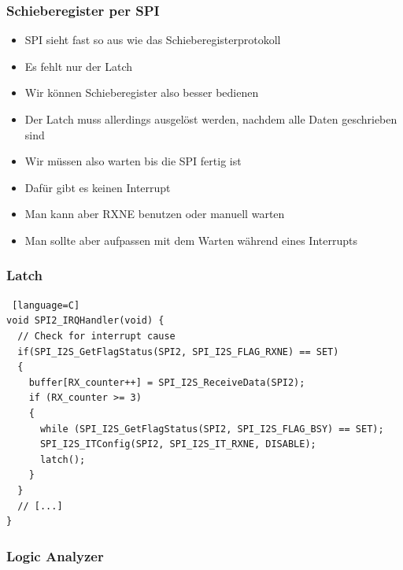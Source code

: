 \documentclass[ngerman,compress]{beamer}
\begin{document}
\begin{frame} [fragile]
	\frametitle{Schieberegister per SPI}
	\begin{itemize}
		\item SPI sieht fast so aus wie das Schieberegisterprotokoll
		\item Es fehlt nur der Latch
		\item Wir können Schieberegister also besser bedienen
		\item Der Latch muss allerdings ausgelöst werden, nachdem alle Daten geschrieben sind
		\item Wir müssen also warten bis die SPI fertig ist
		\item Dafür gibt es keinen Interrupt
		\item Man kann aber RXNE benutzen oder manuell warten
		\item Man sollte aber aufpassen mit dem Warten während eines Interrupts
	\end{itemize}
\end{frame}

\begin{frame} [fragile]
	\frametitle{Latch}
	\begin{lstlisting} [language=C]
void SPI2_IRQHandler(void) {
  // Check for interrupt cause
  if(SPI_I2S_GetFlagStatus(SPI2, SPI_I2S_FLAG_RXNE) == SET)
  {
    buffer[RX_counter++] = SPI_I2S_ReceiveData(SPI2);
    if (RX_counter >= 3)
    {
      while (SPI_I2S_GetFlagStatus(SPI2, SPI_I2S_FLAG_BSY) == SET);
      SPI_I2S_ITConfig(SPI2, SPI_I2S_IT_RXNE, DISABLE);
      latch();
    }
  }
  // [...]
}
	\end{lstlisting}
\end{frame}

\begin{frame} [fragile]
	\frametitle{Logic Analyzer}
\end{frame}
\end{document}
